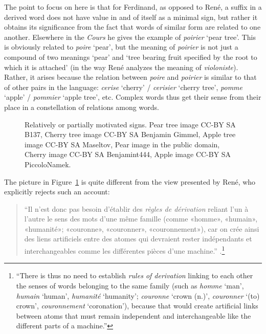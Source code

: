 \documentclass[output=paper]{langsci/langscibook}
\begin{document}
The point to focus on here is that for Ferdinand, as opposed to
Ren\'e, a suffix in a derived word does not have value in and of
itself as a minimal sign, but rather it obtains its significance from
the fact that words of similar form are related to one
another. Elsewhere in the \emph{Cours} he gives the example of
\emph{poirier} `pear tree'. This is obviously related to \emph{poire}
`pear', but the meaning of \emph{poirier} is not just a compound of
two meanings `pear' and `tree bearing fruit specified by the root to
which it is attached' (in the way Ren\'e analyzes the meaning of
\emph{violoniste}). Rather, it arises because the relation between
\emph{poire} and \emph{poirier} is similar to that of other pairs in
the language: \emph{cerise} `cherry' / \emph{cerisier} `cherry tree',
\emph{pomme} `apple' / \emph{pommier} `apple tree', etc. Complex words
thus get their sense from their place in a constellation of relations
among words.

\begin{figure}[htb]
  \begin{center}
    
  \end{center}
  \caption{\label{poirier}Relatively or partially motivated signs.\footnotesize\xspace Pear tree image CC-BY SA B137, Cherry tree image CC-BY SA Benjamin Gimmel, Apple tree image CC-BY SA Maseltov, Pear image in the public domain, Cherry image CC-BY SA Benjamint444, Apple image CC-BY SA PiccoloNamek.}
\end{figure}


The picture in Figure~\ref{poirier} is quite different from the view
presented by Ren\'e, who explicitly rejects such an account:
\begin{quotation}
  ``Il n’est donc pas besoin d’établir des \emph{règles de dérivation}
  reliant l’un à l’autre le sens des mots d’une même famille (comme
  «homme», «humain», «humanité»; «couronne», «couronner»,
  «couronnement»), car on crée ain\-si des liens artificiels entre des
  atomes qui devraient rester indépendants et interchangeables comme
  les différentes pièces d’une
  machine.'' \citep[8]{r.desaussure11:formation}.\footnote{``There is
    thus no need to establish \emph{rules of derivation} linking to
    each other the senses of words belonging to the same family (such
    as \emph{homme} `man', \emph{humain} `human', \emph{humanit\'e}
    `humanity'; \emph{couronne} `crown (n.)', \emph{couronner} `(to)
    crown', \emph{couronnement} `coronation'), because that would
    create artificial links between atoms that must remain independent
    and interchangeable like the different parts of a machine.''}
\end{quotation}
\end{document}
